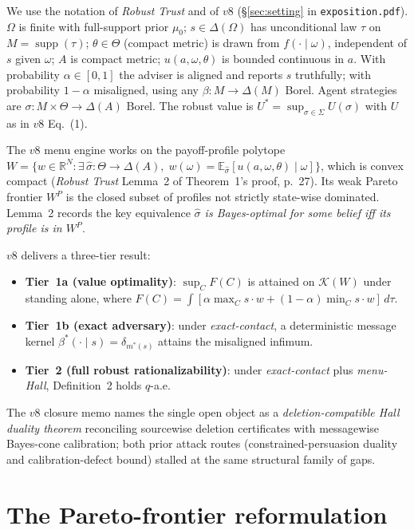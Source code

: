 \documentclass[11pt]{article}
\theoremstyle{definition}
\theoremstyle{remark}
\newcommand{\R}{\mathbb{R}}
\newcommand{\Om}{\Omega}
\newcommand{\Th}{\Theta}
\newcommand{\Si}{\Sigma}
\newcommand{\suppset}{\operatorname{supp}}
\newcommand{\E}{\mathbb{E}}
\newcommand{\K}{\mathcal{K}}
\begin{document}
We use the notation of \emph{Robust Trust} and of $v8$ (\S\ref{sec:setting}
in \texttt{exposition.pdf}). $\Om$ is finite with full-support prior
$\mu_0$; $s\in\Delta(\Om)$ has unconditional law $\tau$ on
$M = \suppset(\tau)$; $\theta\in\Th$ (compact metric) is drawn from
$f(\cdot\mid\omega)$, independent of $s$ given $\omega$; $A$ is compact
metric; $u(a,\omega,\theta)$ is bounded continuous in $a$. With
probability $\alpha\in[0,1]$ the adviser is aligned and reports $s$
truthfully; with probability $1-\alpha$ misaligned, using any
$\beta:M\to\Delta(M)$ Borel. Agent strategies are
$\sigma:M\times\Th\to\Delta(A)$ Borel. The robust value is
$U^* = \sup_{\sigma\in\Si}U(\sigma)$ with $U$ as in $v8$ Eq.~(1).

The $v8$ menu engine works on the payoff-profile polytope
$W = \{w\in\R^N : \exists\,\hat\sigma:\Th\to\Delta(A),\;w(\omega)=\E_{\hat\sigma}[u(a,\omega,\theta)\mid\omega]\}$,
which is convex compact (\emph{Robust Trust} Lemma~2 of Theorem~1's
proof, p.~27). Its weak Pareto frontier $W^P$ is the closed subset of
profiles not strictly state-wise dominated. Lemma~2 records the key
equivalence \emph{$\hat\sigma$ is Bayes-optimal for some belief iff its
profile is in $W^P$}.

$v8$ delivers a three-tier result:
\begin{itemize}
  \item \textbf{Tier~1a (value optimality)}: $\sup_C F(C)$ is attained on
    $\K(W)$ under standing alone, where
    $F(C) = \int[\alpha\max_C s\!\cdot w + (1-\alpha)\min_C s\!\cdot w]\,d\tau$.
  \item \textbf{Tier~1b (exact adversary)}: under \emph{exact-contact},
    a deterministic message kernel $\beta^*(\cdot\mid s) = \delta_{m^*(s)}$
    attains the misaligned infimum.
  \item \textbf{Tier~2 (full robust rationalizability)}: under
    \emph{exact-contact} plus \emph{menu-Hall}, Definition~2 holds
    $q$-a.e.
\end{itemize}
The $v8$ closure memo names the single open object as a
\emph{deletion-compatible Hall duality theorem} reconciling sourcewise
deletion certificates with messagewise Bayes-cone calibration; both
prior attack routes (constrained-persuasion duality and
calibration-defect bound) stalled at the same structural family of
gaps.

\section{The Pareto-frontier reformulation}\label{sec:gp}
\end{document}

